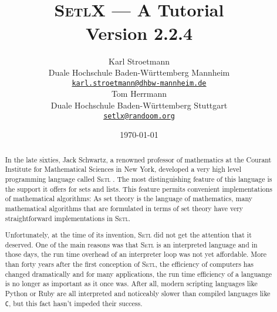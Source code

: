 \documentclass[twoside]{report}
\title{\vspace*{-1cm}
  \epsfig{file=aleph0,scale=0.21} \\[0.5cm]
\textsc{SetlX} --- A Tutorial \\[0.5cm]
Version 2.2.4
}
\author{Karl Stroetmann \\[0.2cm]
Duale Hochschule Baden-W\"urttemberg Mannheim \\[0.2cm]
\href{mailto:karl.stroetmann@dhbw-mannheim.de}{\texttt{karl.stroetmann@dhbw-mannheim.de}} \\[0.5cm]
 Tom Herrmann  \\[0.2cm]
Duale Hochschule Baden-W\"urttemberg Stuttgart \\[0.2cm]
\href{mailto:setlx@randoom.org}{\texttt{setlx@randoom.org}}
}
\date{\today}
\begin{document}
\maketitle

\begin{abstract}
  In the late sixties, Jack Schwartz, a renowned professor of mathematics at the Courant Institute for
Mathematical Sciences in New York, developed a very high level programming language called
\textsc{Setl} 
\cite{schwartz:1970, setl86}.  The most distinguishing feature of this language is the
support it offers for sets and lists.   This feature permits convenient implementations of
mathematical algorithms:  As set theory is the language of mathematics, many mathematical
algorithms that are formulated in terms of set theory have very straightforward implementations in
\textsc{Setl}. 

Unfortunately, at the time of its invention, \textsc{Setl} did not get the attention that it deserved.
One of the main reasons was that \textsc{Setl} is an interpreted language and in those
days, the run time overhead of an interpreter loop was not yet affordable.  More than
forty years after the first conception of \textsc{Setl}, the efficiency of computers has changed
dramatically and for many applications, the run time efficiency of a languange is no
longer as important as it once was.  After all, 
modern scripting languages like Python \cite{vanRossum:95} or Ruby \cite{flanagan:2008}
are all interpreted and noticeably slower than compiled languages like \texttt{C}, but this
fact hasn't impeded their success. 


\end{abstract}
\end{document}
